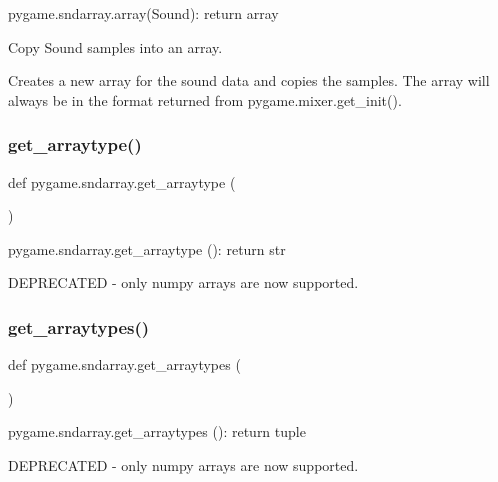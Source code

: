 \begin{DoxyVerb}pygame.sndarray.array(Sound): return array

Copy Sound samples into an array.

Creates a new array for the sound data and copies the samples. The
array will always be in the format returned from
pygame.mixer.get_init().
\end{DoxyVerb}
 \mbox{\label{namespacepygame_1_1sndarray_aef82d5b7b0affb3a556abc4a93a276f9}} 
\subsubsection{\texorpdfstring{get\+\_\+arraytype()}{get\_arraytype()}}
{\footnotesize\ttfamily def pygame.\+sndarray.\+get\+\_\+arraytype (\begin{DoxyParamCaption}{ }\end{DoxyParamCaption})}

\begin{DoxyVerb}pygame.sndarray.get_arraytype (): return str

DEPRECATED - only numpy arrays are now supported.
\end{DoxyVerb}
 \mbox{\label{namespacepygame_1_1sndarray_a42fcfe0e6707784803293ac1a5e315c8}} 
\subsubsection{\texorpdfstring{get\+\_\+arraytypes()}{get\_arraytypes()}}
{\footnotesize\ttfamily def pygame.\+sndarray.\+get\+\_\+arraytypes (\begin{DoxyParamCaption}{ }\end{DoxyParamCaption})}

\begin{DoxyVerb}pygame.sndarray.get_arraytypes (): return tuple

DEPRECATED - only numpy arrays are now supported.
\end{DoxyVerb}
 \mbox{\label{namespacepygame_1_1sndarray_af5dcb27cb21e18d062c67cc6b76c8153}} 
